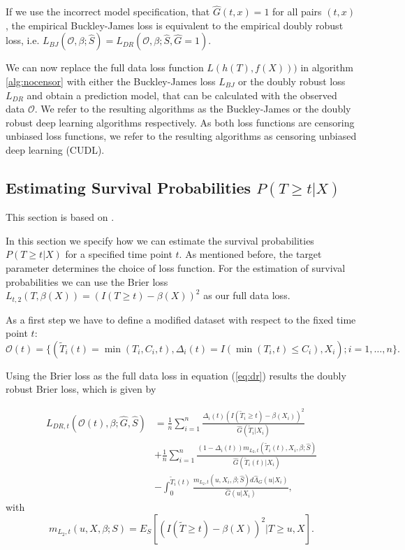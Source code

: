 \documentclass[12pt, a4paper]{article}
\theoremstyle{definition}
\theoremstyle{plain}
\numberwithin{equation}{section}
\numberwithin{figure}{section}
\numberwithin{table}{section}
\begin{document}
	If we use the incorrect model specification, that $\hat{G}(t,x)=1$ for all pairs $(t,x)$, the empirical  Buckley-James loss is equivalent to the empirical doubly robust loss, i.e. $L_{BJ}(\mathcal{O}, \beta; \hat{S})=L_{DR}(\mathcal{O}, \beta; \hat{S}, \hat{G} = 1)$.
	
	We can now replace the full data loss function $L(h(T), f(X)))$ in algorithm \ref{alg:nocensor} with either the Buckley-James loss $L_{BJ}$ or the doubly robust loss $L_{DR}$ and obtain a prediction model, that can be calculated with the observed data $\mathcal{O}$.
	We refer to the resulting algorithms as the Buckley-James or the doubly robust deep learning algorithms respectively.
	As both loss functions are censoring unbiased loss functions, we refer to the resulting algorithms as censoring unbiased deep learning (CUDL). 
	
	\subsection{Estimating Survival Probabilities $P(T\geq t \vert X)$}
	
	This section is based on \citet*{basearticle}.
	
	In this section we specify how we can estimate the survival probabilities $P(T\geq t \vert X)$ for a specified time point $t$.
	As mentioned before, the target parameter determines the choice of loss function.
	For the estimation of survival probabilities we can use the Brier loss $L_{t,2}(T, \beta(X)) = (I(T \geq t) - \beta(X))^2$ as our full data loss.
	
	As a first step we have to define a modified dataset with respect to the fixed time point $t$:
	\begin{equation*}
		\mathcal{O}(t) = \{(\tilde{T}_i(t)=\min(T_i, C_i, t), \Delta_i(t) = I(\min(T_i, t) \leq C_i), X_i); i = 1,\dots,n\}.
	\end{equation*}
	
	Using the Brier loss as the full data loss in equation (\ref{eq:dr}) results the doubly robust Brier loss, which is given by
	
	\begin{equation*}
	\begin{split}
		L_{DR, t}(\mathcal{O}(t),\beta; \hat{G},\hat{S}) &=  \frac{1}{n} \sum_{i=1}^n \frac{\Delta_i(t)(I(\tilde{T}_i \geq t)-\beta(X_i))^2}{\hat{G}(\tilde{T}_i \vert X_i)}\\
		& + \frac{1}{n} \sum_{i=1}^n \frac{(1-\Delta_i(t))m_{L_2,t}(\tilde{T}_i(t),X_i,\beta; \hat{S})}{\hat{G}(\tilde{T}_i(t) \vert X_i)}\\
		& - \int_{0}^{\tilde{T}_i(t)} \frac{m_{L_2,t}(u,X_i,\beta; \hat{S})d\hat{\Lambda}_G(u\vert X_i)}{\hat{G}(u \vert X_i)},
	\end{split}
	\end{equation*}
	 with
	 \begin{equation*}
	 	m_{L_2,t}(u,X,\beta;S) = E_S[(I(\tilde{T}\geq t)-\beta(X))^2 \vert T \geq u, X].
	 \end{equation*}
	
\end{document}
